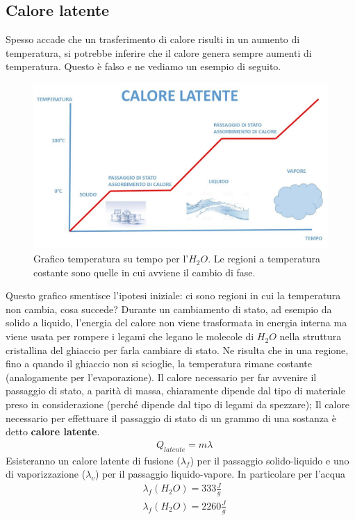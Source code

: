 \documentclass[10pt,a4paper]{article}
\begin{document}
\subsection{Calore latente}
Spesso accade che un trasferimento di calore risulti in un aumento di temperatura, si potrebbe inferire che il calore genera sempre aumenti di temperatura. Questo è falso e ne vediamo un esempio di seguito.\\
\begin{figure}[h!]
	\centering
	\includegraphics[width=0.6\linewidth]{"../images/calore specifico acqua(1)"}
	\caption{Grafico temperatura su tempo per l'$H_2 O$. Le regioni a temperatura costante sono quelle in cui avviene il cambio di fase.}
	\label{fig:calore-specifico-acqua1}
\end{figure}
\FloatBarrier
Questo grafico smentisce l'ipotesi iniziale: ci sono regioni in cui la temperatura non cambia, cosa succede? Durante un cambiamento di stato, ad esempio da solido a liquido, l'energia del calore non viene trasformata in energia interna ma viene usata per rompere i legami che legano le molecole di $H_2O$ nella struttura cristallina del ghiaccio per farla cambiare di stato. Ne risulta che in una regione, fino a quando il ghiaccio non si scioglie, la temperatura rimane costante (analogamente per l'evaporazione). Il calore necessario per far avvenire il passaggio di stato, a parità di massa, chiaramente dipende dal tipo di materiale preso in considerazione (perché dipende dal tipo di legami da spezzare);  Il calore necessario per effettuare il passaggio di stato di un grammo di una sostanza è detto \textbf{calore latente}.
\begin{align*} 
	&Q_{latente} = m \lambda
\end{align*} 
 Esisteranno un calore latente di fusione ($\lambda_f$) per il passaggio solido-liquido e uno di vaporizzazione ($\lambda_v$) per il passaggio liquido-vapore. In particolare per l'acqua
\begin{align*} 
	&\lambda_f(H_2O) = 333 \frac{J}{g} \\
	&\lambda_f(H_2O) = 2260 \frac{J}{g} 
\end{align*} 
\end{document}
